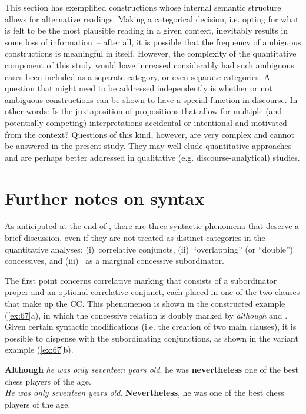 This section has exemplified constructions whose internal semantic structure allows for alternative readings. Making a categorical decision, i.e. opting for what is felt to be the most plausible reading in a given context, inevitably results in some loss of information~– after all, it is possible that the frequency of ambiguous constructions is meaningful in itself. However, the complexity of the quantitative component of this study would have increased considerably had such ambiguous cases been included as a separate category, or even separate categories. A question that might need to be addressed independently is whether or not ambiguous constructions can be shown to have a special function in discourse. In other words: Is the juxtapo\-sition of propositions that allow for multiple (and potentially competing) interpretations accidental or intentional and motivated from the context? Questions of this kind, however, are very complex and cannot be answered in the present study. They may well elude quantitative approaches and are perhaps better addressed in qualitative (e.g. discourse-analytical) studies.

\section{\label{bkm:Ref496533952}Further notes on syntax}\label{sec:3.5}

As anticipated at the end of , there are three syntactic phenomena that deserve a brief discussion, even if they are not treated as distinct categories in the quantitative analyses:
(i)~correlative conjuncts,
(ii)~“overlapping” (or “double”) concessives, and
(iii)~ as a marginal concessive subordinator.

The first point concerns correlative marking that consists of a subordinator proper and an optional correlative conjunct, each placed in one of the two clauses that make up the CC. This phenomenon is shown in the constructed example (\ref{ex:67}a), in which the concessive relation is doubly marked by \textit{although} and . Given certain syntactic modifications (i.e. the creation of two main clauses), it is possible to dispense with the subordinating conjunctions, as shown in the variant example (\ref{ex:67}b).

\ea\label{ex:67}
    \ea\label{ex:67a}\textbf{Although} \textit{he was only seventeen years old}, he was \textbf{nevertheless} one of the best chess players of the age.\\
    \ex\label{ex:67b}\textit{He was only seventeen years old}. \textbf{Nevertheless}, he was one of the best chess players of the age.\\
\z
\z


